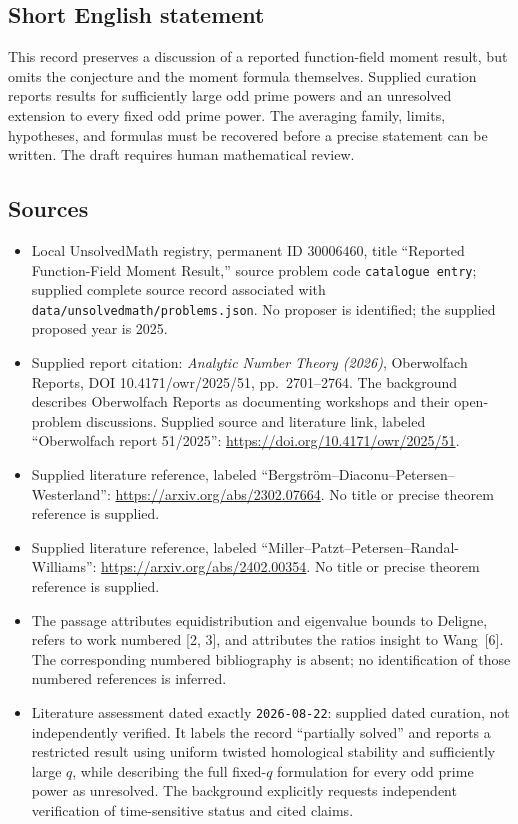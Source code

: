 \documentclass[11pt]{article}
\begin{document}
\subsection{Short English statement}
This record preserves a discussion of a reported function-field moment result, but omits the conjecture and the moment formula themselves. Supplied curation reports results for sufficiently large odd prime powers and an unresolved extension to every fixed odd prime power. The averaging family, limits, hypotheses, and formulas must be recovered before a precise statement can be written. The draft requires human mathematical review.
\subsection{Sources}
\begin{itemize}
\item Local UnsolvedMath registry, permanent ID \(30006460\), title ``Reported Function-Field Moment Result,'' source problem code \texttt{catalogue entry}; supplied complete source record associated with \texttt{data/unsolvedmath/problems.json}. No proposer is identified; the supplied proposed year is 2025.
\item Supplied report citation: \emph{Analytic Number Theory (2026)}, Oberwolfach Reports, DOI 10.4171/owr/2025/51, pp.~2701--2764. The background describes Oberwolfach Reports as documenting workshops and their open-problem discussions. Supplied source and literature link, labeled ``Oberwolfach report 51/2025'': \url{https://doi.org/10.4171/owr/2025/51}.
\item Supplied literature reference, labeled ``Bergstr\"om--Diaconu--Petersen--Westerland'': \url{https://arxiv.org/abs/2302.07664}. No title or precise theorem reference is supplied.
\item Supplied literature reference, labeled ``Miller--Patzt--Petersen--Randal-Williams'': \url{https://arxiv.org/abs/2402.00354}. No title or precise theorem reference is supplied.
\item The passage attributes equidistribution and eigenvalue bounds to Deligne, refers to work numbered [2, 3], and attributes the ratios insight to Wang~[6]. The corresponding numbered bibliography is absent; no identification of those numbered references is inferred.
\item Literature assessment dated exactly \texttt{2026-08-22}: supplied dated curation, not independently verified. It labels the record ``partially solved'' and reports a restricted result using uniform twisted homological stability and sufficiently large \(q\), while describing the full fixed-\(q\) formulation for every odd prime power as unresolved. The background explicitly requests independent verification of time-sensitive status and cited claims.

\end{itemize}
\end{document}
